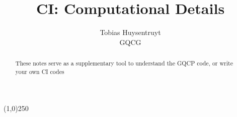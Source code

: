 \documentclass[12p]{article}
\title{CI: Computational Details}
\author{Tobias Huysentruyt \\ GQCG}
\begin{document}
\maketitle


\begin{abstract} \noindent  %
    These notes serve as a supplementary tool to understand the GQCP code, or write your own CI codes
\end{abstract}

\begin{center}
    \line(1,0){250}
\end{center}

\tableofcontents
\newpage


\newpage


\newpage


\newpage

\end{document}
